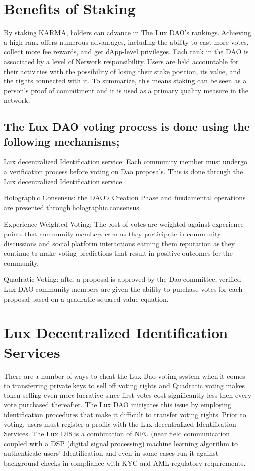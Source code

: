 \documentclass[11pt]{article}
\begin{document}
\section{Benefits of Staking}

By staking KARMA, holders can advance in The Lux DAO's rankings. Achieving a high rank offers numerous advantages, including the ability to cast more votes, collect more fee rewards, and get dApp-level privileges. Each rank in the DAO is associated by a level of Network responsibility. Users are held accountable for their activities with the possibility of losing their stake position, its value, and the rights connected with it. To summarize, this means staking can be seen as a person's proof of commitment and it is used as a primary quality measure in the network.


\subsection{The Lux DAO voting process is done using the following mechanisms;}

Lux decentralized Identification service: Each community member must undergo a verification process before voting on Dao proposals. This is done through the Lux decentralized Identification service.


Holographic Consensus: the DAO's Creation Phase and fundamental operations are presented through holographic consensus.


Experience Weighted Voting: The cost of votes are weighted against experience points that community members earn as they participate in community discussions and social platform interactions earning them reputation as they continue to make voting predictions that result in positive outcomes for the community.


Quadratic Voting:  after a proposal is approved by the Dao committee, verified  Lux DAO community members are given the ability to purchase votes for each proposal based on a quadratic squared value equation.


\section{Lux Decentralized Identification Services}

There are a number of ways to cheat the Lux Dao voting system when it comes to transferring private keys to sell off voting rights and Quadratic voting makes token-selling even more lucrative since first votes cost significantly less then every vote purchased thereafter. The Lux DAO mitigates this issue by employing identification procedures that make it difficult to transfer voting rights. Prior to voting, users must register a profile with the Lux decentralized Identification Services. The Lux DIS is a combination of NFC (near field communication coupled with a DSP (digital signal processing) machine learning algorithm to authenticate users' Identification and even in some cases run it against background checks in compliance with KYC and AML regulatory requirements.
\end{document}
